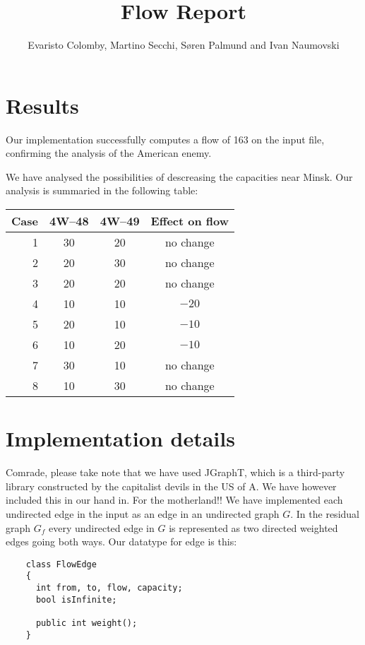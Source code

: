\documentclass{tufte-handout}
\title{Flow Report}
\author{Evaristo Colomby, Martino Secchi, Søren Palmund and Ivan Naumovski}
\begin{document}
	\maketitle
  \section{Results}

  Our implementation successfully computes a flow of 163 on the input file, confirming the analysis of the American enemy.

  We have analysed the possibilities of descreasing the capacities near Minsk.
  Our analysis is summaried in the following table:

\bigskip
  \begin{tabular}{rccc}\toprule
    Case & 4W--48	& 4W--49	& Effect on flow	\\\midrule
    1		& 30			& 20			& no change 		\\
    2		& 20 			& 30 			& no change 		\\
    3		& 20			& 20			& no change 			\\
    4		& 10			& 10			& $-20$				\\
    5		& 20			& 10			& $-10$				\\
    6		& 10			& 20			& $-10$				\\
    7		& 30			& 10			& no change				\\
    8		& 10			& 30			& no change				\\\bottomrule
  \end{tabular}
  \bigskip
  
  \section{Implementation details}

	Comrade, please take note that we have used JGraphT, which is a third-party library constructed by the capitalist devils in the US of A. We have however included this in our hand in. For the motherland!!
	  We have implemented each undirected edge in the input as an edge in an undirected graph $G$. In the residual graph $G_f$ every undirected edge in $G$ is represented as two directed weighted edges going both ways.
  Our datatype for edge is this:
  \begin{verbatim}
    class FlowEdge
    {
      int from, to, flow, capacity;
      bool isInfinite;
      
      public int weight();
    }
  \end{verbatim}
	
\end{document}
